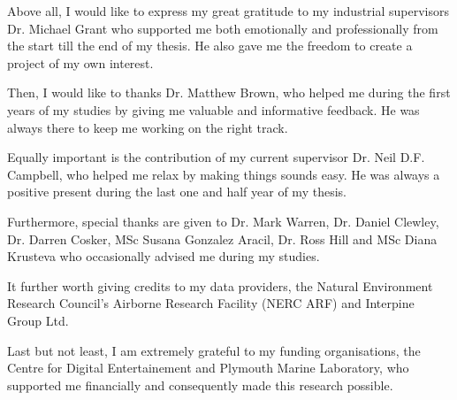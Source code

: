\documentclass{subfiles}
\begin{document}
	\par Above all, I would like to express my great gratitude to my industrial supervisors Dr. Michael Grant who supported me both emotionally and professionally from the start till the end of my thesis. He also gave me the freedom to create a project of my own interest.
	
	\par Then, I would like to thanks Dr. Matthew Brown, who helped me during the first years of my studies by giving me valuable and informative feedback. He was always there to keep me working on the right track. 
	
	\par Equally important is the contribution of my current supervisor Dr. Neil D.F. Campbell, who helped me relax by making things sounds easy. He was always a positive present during the last one and half year of my thesis.
	
	\par Furthermore, special thanks are given to Dr. Mark Warren, Dr.  Daniel Clewley, Dr. Darren Cosker, MSc Susana Gonzalez Aracil, Dr. Ross Hill and MSc Diana Krusteva who occasionally advised me during my studies. 
	
	\par It further worth giving credits to my data providers, the Natural Environment Research Council’s Airborne Research Facility (NERC ARF) and Interpine Group Ltd. 
	
	\par Last but not least, I am extremely grateful to my funding organisations, the Centre for Digital Entertainement and Plymouth Marine Laboratory, who supported me financially and consequently made this research possible. 
	

	
\end{document}
